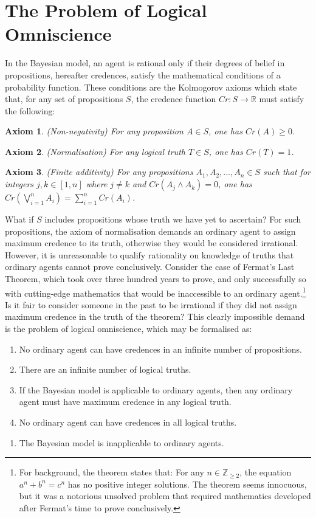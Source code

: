 \documentclass[12pt]{article}
\newtheorem{axiom}{Axiom}
\begin{document}
\section{The Problem of Logical Omniscience}
In the Bayesian model, an agent is rational only if their degrees of belief in propositions, hereafter credences, satisfy the mathematical conditions of a probability function.\autocite[13]{bdrc} These conditions are the Kolmogorov axioms which state that, for any set of propositions $S$, the credence function $Cr:S\rightarrow\mathbb{R}$ must satisfy the following:
\begin{axiom}
    (Non-negativity) For any proposition $A\in S$, one has $Cr(A)\geq0$.
\end{axiom}
\begin{axiom}
    (Normalisation) For any logical truth $T\in S$, one has $Cr(T)=1$.
\end{axiom}
\begin{axiom}
    (Finite additivity) For any propositions $A_1, A_2, ..., A_n\in S$ such that for integers $j,k\in[1,n]$ where $j\neq k$ and $Cr(A_j\land A_k)=0$, one has $Cr(\bigvee_{i=1}^{n}A_i)=\sum_{i=1}^{n}Cr(A_i)$.
\end{axiom}
What if $S$ includes propositions whose truth we have yet to ascertain? For such propositions, the axiom of normalisation demands an ordinary agent to assign maximum credence to its truth, otherwise they would be considered irrational. However, it is unreasonable to qualify rationality on knowledge of truths that ordinary agents cannot prove conclusively. Consider the case of Fermat's Last Theorem, which took over three hundred years to prove, and only successfully so with cutting-edge mathematics that would be inaccessible to an ordinary agent.\footnote{For background, the theorem states that: For any $n\in\mathbb{Z}_{\geq2}$, the equation $a^n+b^n=c^n$ has no positive integer solutions. The theorem seems innocuous, but it was a notorious unsolved problem that required mathematics developed after Fermat's time to prove conclusively.} Is it fair to consider someone in the past to be irrational if they did not assign maximum credence in the truth of the theorem?\autocite[108]{dogramaci} This clearly impossible demand is the problem of logical omniscience, which may be formalised as:\autocite{youtube}
\begin{enumerate}[label=\textbf{P\arabic*:},leftmargin=0.5in]
    \item No ordinary agent can have credences in an infinite number of propositions.
    \item There are an infinite number of logical truths.
    \item If the Bayesian model is applicable to ordinary agents, then any ordinary agent must have maximum credence in any logical truth.
    \item No ordinary agent can have credences in all logical truths.
\end{enumerate}
\begin{enumerate}[resume,label=\textbf{C:}, topsep=0pt, leftmargin=0.5in]
    \item The Bayesian model is inapplicable to ordinary agents.
\end{enumerate}
\end{document}
